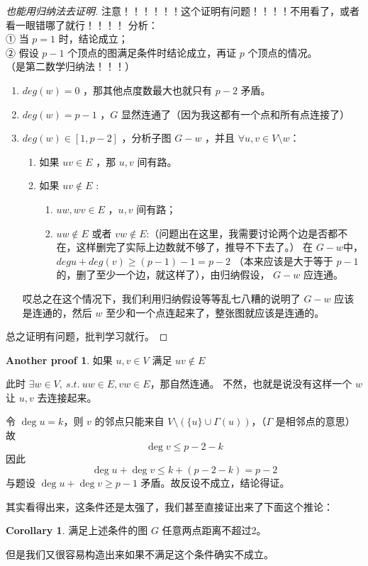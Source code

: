 \documentclass[oneside]{book}
\theoremstyle{definition}
\newtheorem{corollary}{Corollary}[section]
\newtheorem*{ap}{Another proof}
\begin{document}
\begin{proof}[也能用归纳法去证明]
	注意！！！！！！这个证明有问题！！！！不用看了，或者看一眼错哪了就行！！！！
	分析：\\
	① 当 \( p=1 \) 时，结论成立；\\
	② 假设 \( p-1 \) 个顶点的图满足条件时结论成立，再证 \( p \) 个顶点的情况。\\
（是第二数学归纳法！！！）
	\begin{enumerate}
		\item \(deg(w)=0\) ，那其他点度数最大也就只有 \(p-2\) 矛盾。
		\item \(deg(w)=p-1\) ，\(G\) 显然连通了（因为我这都有一个点和所有点连接了）
		\item \(deg(w)\in[1,p-2]\) ，分析子图 \( G-w \) ，并且 \(\forall u,v\in V\setminus w\)：
		\begin{enumerate}
			\item 如果 \(uv\in E\) ，那 \(u,v\) 间有路。
			\item 如果 \(uv\notin E\) :
			\begin{enumerate}
				\item \(uw,wv\in E\) ，\(u,v\) 间有路；
				\item \(uw\notin E \) 或者 \(vw\notin E\):（问题出在这里，我需要讨论两个边是否都不在，这样删完了实际上边数就不够了，推导不下去了。）
				在 \(G-w\)中，\(deg{u}+deg(v)\geq (p-1)-1=p-2\) （本来应该是大于等于 \(p-1\) 的，删了至少一个边，就这样了），由归纳假设， \(G-w\) 应连通。
			\end{enumerate}
		\end{enumerate}
		哎总之在这个情况下，我们利用归纳假设等等乱七八糟的说明了 \(G-w\) 应该是连通的，然后 \(w\) 至少和一个点连起来了，整张图就应该是连通的。
	\end{enumerate}
	
	
	总之证明有问题，批判学习就行。
\end{proof}
	
	\begin{ap}
		如果 \( u,v \in V \) 满足 \( uv \notin E \)
		
		此时 \(\exists w\in V,\ s.t.\ uw\in E,vw\in E\)，那自然连通。
		不然，也就是说没有这样一个 \(w\) 让 \(u,v\) 去连接起来。
		
		令 \( \deg u = k \)，则 \( v \) 的邻点只能来自 \( V \setminus (\{u\} \cup \Gamma(u)) \)，（\(\Gamma\) 是相邻点的意思）故
		\[
		\deg v \leq p - 2 - k
		\]
		因此
		\[
		\deg u + \deg v \leq k + (p-2 -k) = p-2
		\]
		与题设 \( \deg u + \deg v \geq p-1 \) 矛盾。故反设不成立，结论得证。
	\end{ap}
	其实看得出来，这条件还是太强了，我们甚至直接证出来了下面这个推论：
	\begin{corollary}
		满足上述条件的图 \( G \) 任意两点距离不超过2。
	\end{corollary}
	但是我们又很容易构造出来如果不满足这个条件确实不成立。
\end{document}
